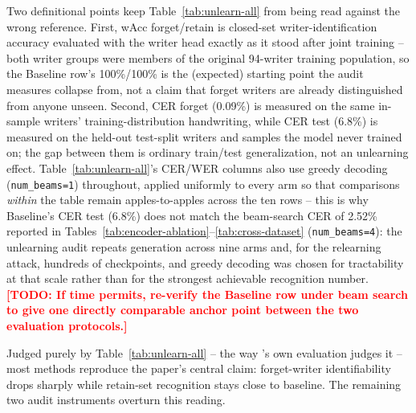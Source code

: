 \documentclass[a4paper,fleqn]{cas-dc}
\newcommand{\todo}[1]{\textcolor{red}{\textbf{[TODO: #1]}}}
\begin{document}
Two definitional points keep Table~\ref{tab:unlearn-all} from being read
against the wrong reference. First, wAcc forget/retain is closed-set
writer-identification accuracy evaluated with the writer head exactly as
it stood after joint training -- both writer groups were members of the
original 94-writer training population, so the Baseline row's 100\%/100\%
is the (expected) starting point the audit measures collapse from, not a
claim that forget writers are already distinguished from anyone unseen.
Second, CER forget (0.09\%) is measured on the same in-sample writers'
training-distribution handwriting, while CER test (6.8\%) is measured on
the held-out test-split writers and samples the model never trained on;
the gap between them is ordinary train/test generalization, not an
unlearning effect. Table~\ref{tab:unlearn-all}'s CER/WER columns also use
greedy decoding (\texttt{num\_beams=1}) throughout, applied uniformly to
every arm so that comparisons \emph{within} the table remain apples-to-apples
across the ten rows -- this is why Baseline's CER test (6.8\%) does not
match the beam-search CER of 2.52\% reported in
Tables~\ref{tab:encoder-ablation}--\ref{tab:cross-dataset}
(\texttt{num\_beams=4}): the unlearning audit repeats generation across
nine arms and, for the relearning attack, hundreds of checkpoints, and
greedy decoding was chosen for tractability at that scale rather than for
the strongest achievable recognition number. \todo{If time permits,
re-verify the Baseline row under beam search to give one directly
comparable anchor point between the two evaluation protocols.}

Judged purely by Table~\ref{tab:unlearn-all} -- the way
\citet{kang2026privacy}'s own evaluation judges it -- most methods
reproduce the paper's central claim: forget-writer identifiability drops
sharply while retain-set recognition stays close to baseline. The
remaining two audit instruments overturn this reading.
\end{document}
